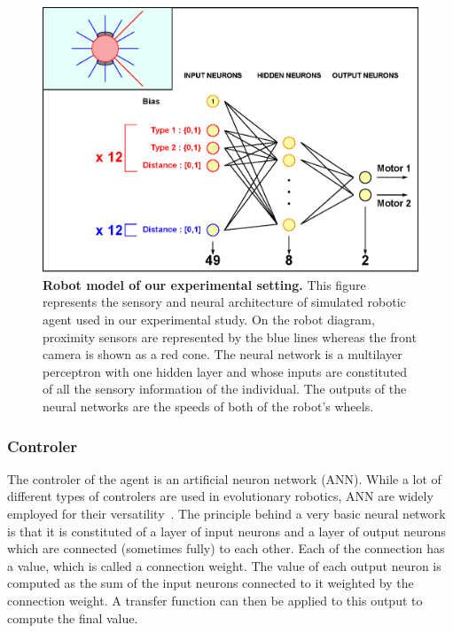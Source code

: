     \begin{figure}[hbt]
        \begin{center}
          \includegraphics[scale = 0.60]{fig/Intro/RobotModel.eps}
          \caption{\textbf{Robot model of our experimental setting.}
          This figure represents the sensory and neural architecture of simulated robotic agent used in our experimental study. On the robot diagram, proximity sensors are represented by the blue lines whereas the front camera is shown as a red cone. The neural network is a multilayer perceptron with one hidden layer and whose inputs are constituted of all the sensory information of the individual. The outputs of the neural networks are the speeds of both of the robot's wheels.} 
          \label{fig:RobotModel}
        \end{center}
    \end{figure}

    \subsubsection{Controler} The controler of the agent is an artificial neuron network (ANN). While a lot of different types of controlers are used in evolutionary robotics, ANN are widely employed for their versatility~\parencite{Doncieux2015a}. The principle behind a very basic neural network is that it is constituted of a layer of input neurons and a layer of output neurons which are connected (sometimes fully) to each other. Each of the connection has a value, which is called a connection weight. The value of each output neuron is computed as the sum of the input neurons connected to it weighted by the connection weight. A transfer function can then be applied to this output to compute the final value. 

